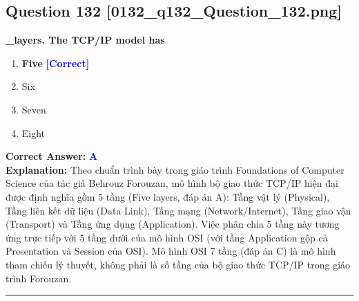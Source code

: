 \documentclass[11pt,a4paper]{article}
\begin{document}
\begin{minipage}{\textwidth}
\subsection*{Question 132 \quad \footnotesize{[0132\_q132\_Question\_132.png]}}
\noindent \textbf{\_layers. The TCP/IP model has}

\begin{enumerate}[label=\Alph*.]
    \item \textbf{Five} \hfill \textcolor{blue}{\textbf{[Correct]}}
    \item Six
    \item Seven
    \item Eight
\end{enumerate}

\noindent \textbf{Correct Answer:} \textcolor{blue}{\textbf{A}} \\[2pt]
\noindent \textbf{Explanation:} Theo chuẩn trình bày trong giáo trình Foundations of Computer Science của tác giả Behrouz Forouzan, mô hình bộ giao thức TCP/IP hiện đại được định nghĩa gồm 5 tầng (Five layers, đáp án A): Tầng vật lý (Physical), Tầng liên kết dữ liệu (Data Link), Tầng mạng (Network/Internet), Tầng giao vận (Transport) và Tầng ứng dụng (Application). Việc phân chia 5 tầng này tương ứng trực tiếp với 5 tầng dưới của mô hình OSI (với tầng Application gộp cả Presentation và Session của OSI). Mô hình OSI 7 tầng (đáp án C) là mô hình tham chiếu lý thuyết, không phải là số tầng của bộ giao thức TCP/IP trong giáo trình Forouzan.

\par\vspace{0.3cm}
\hrule
\vspace{0.3cm}
\end{minipage}
\end{document}
